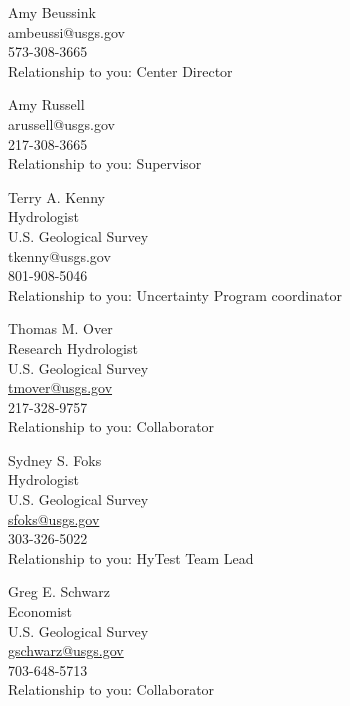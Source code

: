 \documentclass[12pt]{article}
\begin{document}
\begin{multicols}{2}
\raggedright

Amy Beussink\\
ambeussi@usgs.gov \\
573-308-3665 \\
Relationship to you: Center Director

\vspace{10pt}

Amy Russell\\
arussell@usgs.gov \\
217-308-3665\\
Relationship to you: Supervisor

\vspace{10pt}

Terry A. Kenny\\
Hydrologist\\
U.S. Geological Survey\\
tkenny@usgs.gov  \\
801-908-5046\\
Relationship to you: Uncertainty Program coordinator

\vspace{10pt}

Thomas M. Over\\
Research Hydrologist\\
U.S. Geological Survey\\
\url{tmover@usgs.gov}\\
217-328-9757\\
Relationship to you: Collaborator

\vspace{10pt}

Sydney S. Foks\\
Hydrologist\\
U.S. Geological Survey\\
\url{sfoks@usgs.gov} \\
303-326-5022\\
Relationship to you: HyTest Team Lead

\vspace{10pt}
Greg E. Schwarz\\
Economist\\
U.S. Geological Survey\\
\url{gschwarz@usgs.gov}\\
703-648-5713\\
Relationship to you: Collaborator


\end{multicols}
\end{document}
